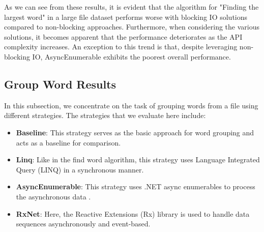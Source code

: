 As we can see from these results, it is evident that the algorithm for "Finding the largest word" in a large file dataset performs worse with blocking IO solutions compared to non-blocking approaches. Furthermore, when considering the various solutions, it becomes apparent that the performance deteriorates as the API complexity increases. An exception to this trend is that, despite leveraging non-blocking IO, AsyncEnumerable exhibits the poorest overall performance.

\clearpage


\subsection{Group Word Results}
\label{subsubsec:group_word_processing_times_cs}

In this subsection, we concentrate on the task of grouping words from a file using different strategies. The strategies that we evaluate here include:

\begin{itemize}
    \item \textbf{Baseline}: This strategy serves as the basic approach for word grouping and acts as a baseline for comparison.
    \item \textbf{Linq}: Like in the find word algorithm, this strategy uses Language Integrated Query (LINQ) in a synchronous manner.
    \item \textbf{AsyncEnumerable}: This strategy uses .NET async enumerables to process the asynchronous data .
    \item \textbf{RxNet}: Here, the Reactive Extensions (Rx) library is used to handle data sequences asynchronously and event-based.
\end{itemize}



